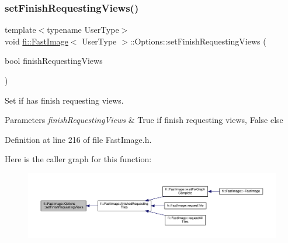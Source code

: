 \subsubsection{\texorpdfstring{set\+Finish\+Requesting\+Views()}{setFinishRequestingViews()}}
{\footnotesize\ttfamily template$<$typename User\+Type$>$ \\
void \hyperlink{classfi_1_1FastImage}{fi\+::\+Fast\+Image}$<$ User\+Type $>$\+::Options\+::set\+Finish\+Requesting\+Views (\begin{DoxyParamCaption}\item[{bool}]{finish\+Requesting\+Views }\end{DoxyParamCaption})\hspace{0.3cm}{\ttfamily [inline]}}



Set if has finish requesting views. 


\begin{DoxyParams}{Parameters}
{\em finish\+Requesting\+Views} & True if finish requesting views, False else \\
\hline
\end{DoxyParams}


Definition at line 216 of file Fast\+Image.\+h.

Here is the caller graph for this function\+:
\nopagebreak
\begin{figure}[H]
\begin{center}
\leavevmode
\includegraphics[width=350pt]{dc/db9/classfi_1_1FastImage_1_1Options_a7c0ae60a439a4be02b4600618e2fcebe_icgraph}
\end{center}
\end{figure}
\mbox{\label{classfi_1_1FastImage_1_1Options_a30f2268883c5391b015d5dd737793da5}} 
